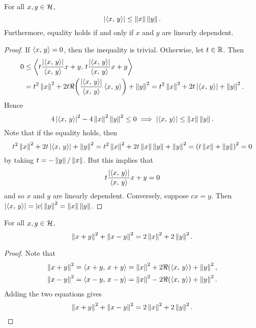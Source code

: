 \begin{proposition}
    For all $x,y\in\mathcal{H}$, 
    \begin{equation*}
        \left\lvert {\left\langle {x},\, {y} \right\rangle} \right\rvert \leq \left\lVert {x} \right\rVert\left\lVert {y} \right\rVert.
    \end{equation*}
    Furthermore, equality holds if and only if $x$ and $y$ are linearly 
    dependent.
\end{proposition}
\begin{proof}
    If $\left\langle {x},\, {y} \right\rangle = 0$, then the inequality is trivial. Otherwise, let 
    $t\in\mathbb{R}$. Then 
    \begin{equation*}
        \begin{split}
            0 &\leq \inp{t\frac{\abs{\inp{x}{y}}}{\inp{x}{y}}x+y}{t\frac{\abs{\inp{x}{y}}}{\inp{x}{y}}x+y} \\
            &= t^2\norm{x}^2 + 2t\Re\pth{\frac{\abs{\inp{x}{y}}}{\inp{x}{y}}\inp{x}{y}} + \norm{y}^2 
            = t^2\norm{x}^2 + 2t\abs{\inp{x}{y}} + \norm{y}^2.
        \end{split}
    \end{equation*}
    Hence 
    \begin{equation*}
        4\left\lvert {\left\langle {x},\, {y} \right\rangle} \right\rvert^2 - 4\left\lVert {x} \right\rVert^2\left\lVert {y} \right\rVert^2 \leq 0
        \implies \left\lvert {\left\langle {x},\, {y} \right\rangle} \right\rvert \leq \left\lVert {x} \right\rVert\left\lVert {y} \right\rVert.
    \end{equation*}
    Note that if the equality holds, then 
    \begin{equation*}
        t^2\norm{x}^2 + 2t\abs{\inp{x}{y}} + \norm{y}^2 
        = t^2\norm{x}^2 + 2t\norm{x}\norm{y} + \norm{y}^2  
        = \pth{t\norm{x} + \norm{y}}^2 = 0
    \end{equation*}
    by taking $t = -\left\lVert {y} \right\rVert/\left\lVert {x} \right\rVert$. But this implies that 
    \begin{equation*}
        t\frac{\left\lvert {\left\langle {x},\, {y} \right\rangle} \right\rvert}{\left\langle {x},\, {y} \right\rangle}x+y = 0
    \end{equation*}
    and so $x$ and $y$ are linearly dependent. Conversely, suppose $cx = y$.
    Then $\left\lvert {\left\langle {x},\, {y} \right\rangle} \right\rvert = \left\lvert {c} \right\rvert\left\lVert {y} \right\rVert^2 = \left\lVert {x} \right\rVert\left\lVert {y} \right\rVert$.
\end{proof}

\begin{proposition}
    For all $x,y\in\mathcal{H}$, 
    \begin{equation*}
        \left\lVert {x+y} \right\rVert^2 + \left\lVert {x-y} \right\rVert^2 = 2\left\lVert {x} \right\rVert^2 + 2\left\lVert {y} \right\rVert^2.
    \end{equation*}
\end{proposition}
\begin{proof}
    Note that 
    \begin{align*}
        \norm{x+y}^2 = \inp{x+y}{x+y} &= \norm{x}^2 + 2\Re\pth{\inp{x}{y}} + \norm{y}^2, \\
        \norm{x-y}^2 = \inp{x-y}{x-y} &= \norm{x}^2 - 2\Re\pth{\inp{x}{y}} + \norm{y}^2.
    \end{align*}
    Adding the two equations gives 
    \begin{equation*}
        \left\lVert {x+y} \right\rVert^2 + \left\lVert {x-y} \right\rVert^2 = 2\left\lVert {x} \right\rVert^2 + 2\left\lVert {y} \right\rVert^2.
    \end{equation*}
\end{proof}

